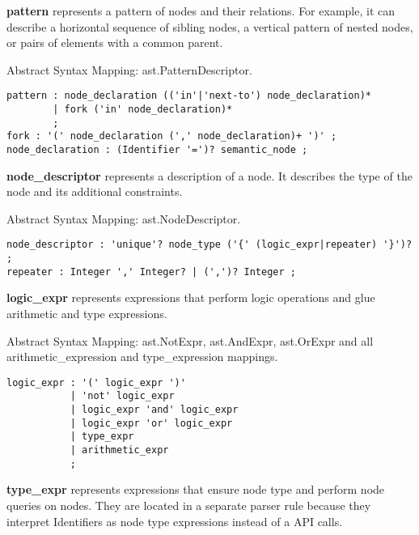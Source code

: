 \begin{description}
\item\textbf{pattern} represents a pattern of nodes and their relations. For example, it can describe a horizontal sequence of sibling nodes, a vertical pattern of nested nodes, or pairs of elements with a common parent. 

Abstract Syntax Mapping: ast.PatternDescriptor.

\begin{snippet}
\begin{verbatim}
pattern : node_declaration (('in'|'next-to') node_declaration)*
        | fork ('in' node_declaration)*
        ;
fork : '(' node_declaration (',' node_declaration)+ ')' ;
node_declaration : (Identifier '=')? semantic_node ;
\end{verbatim}
\end{snippet}

\item\textbf{node\_descriptor} represents a description of a node. It describes the type of the node and its additional constraints. 

Abstract Syntax Mapping: ast.NodeDescriptor.

\begin{snippet}
\begin{verbatim}
node_descriptor : 'unique'? node_type ('{' (logic_expr|repeater) '}')? ;
repeater : Integer ',' Integer? | (',')? Integer ;
\end{verbatim}
\end{snippet}


\item\textbf{logic\_expr} represents expressions that perform logic operations and glue arithmetic and type expressions. 

Abstract Syntax Mapping: ast.NotExpr, ast.AndExpr, ast.OrExpr and all arithmetic\_expression and type\_expression mappings.

\begin{snippet}
\begin{verbatim}
logic_expr : '(' logic_expr ')'
           | 'not' logic_expr
           | logic_expr 'and' logic_expr
           | logic_expr 'or' logic_expr
           | type_expr
           | arithmetic_expr
           ;
\end{verbatim}
\end{snippet}

\item\textbf{type\_expr} represents expressions that ensure node type and perform node queries on nodes. They are located in a separate parser rule because they interpret Identifiers as node type expressions instead of a API calls. 


\end{description}
